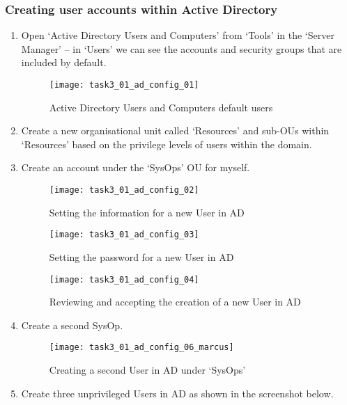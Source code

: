 \subsubsection{Creating user accounts within Active Directory}
\begin{enumerate}[series=task3methodology2]
  \item Open `Active Directory Users and Computers' from `Tools' in the `Server Manager' -- in `Users' we can see the accounts and security groups that are included by default.
    \begin{figure}[H]
      \centering
      \captionsetup{skip=2pt}
      \texttt{[image: task3\_01\_ad\_config\_01]}
      \caption{Active Directory Users and Computers default users}
      \label{fig:task3:ad_config_01}
    \end{figure}
  \item Create a new organisational unit called `Resources' and sub-OUs within `Resources' based on the privilege levels of users within the domain.
  \item Create an account under the `SysOps' OU for myself.
    \begin{figure}[H]
      \centering
      \captionsetup{skip=2pt}
      \texttt{[image: task3\_01\_ad\_config\_02]}
      \caption{Setting the information for a new User in AD}
      \label{fig:task3:ad_config_02}
    \end{figure}
    \begin{figure}[H]
      \centering
      \captionsetup{skip=2pt}
      \texttt{[image: task3\_01\_ad\_config\_03]}
      \caption{Setting the password for a new User in AD}
      \label{fig:task3:ad_config_03}
    \end{figure}
    \begin{figure}[H]
      \centering
      \captionsetup{skip=2pt}
      \texttt{[image: task3\_01\_ad\_config\_04]}
      \caption{Reviewing and accepting the creation of a new User in AD}
      \label{fig:task3:ad_config_04}
    \end{figure}
  \item Create a second SysOp.
    \begin{figure}[H]
      \centering
      \captionsetup{skip=2pt}
      \texttt{[image: task3\_01\_ad\_config\_06\_marcus]}
      \caption{Creating a second User in AD under `SysOps'}
      \label{fig:task3:ad_config_06}
    \end{figure}
  \item Create three unprivileged Users in AD as shown in the screenshot below.

\end{enumerate}
